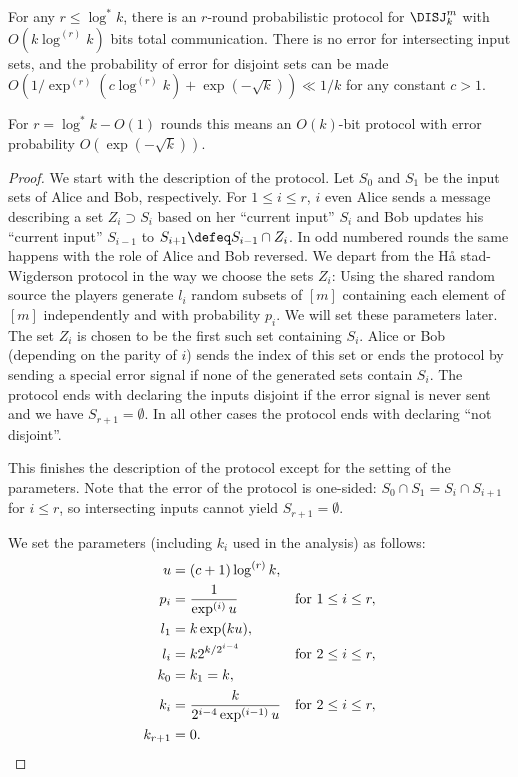 \begin{theorem}\label{thm:ub}
For any $r\leq \log^*k$, there is an $r$-round probabilistic
protocol for $\DISJ^m_k$ with $O(k\log^{(r)}k)$ bits total
communication. There is no error for intersecting input sets,
and the probability of error for disjoint sets can be made
$O(1/\exp^{(r)}(c\log^{(r)} k)+ \exp(-\sqrt k))\ll 1/k$ for any
constant $c > 1$.

For $r=\log^*k-O(1)$ rounds this means an $O(k)$-bit protocol
with error probability $O(\exp(-\sqrt k))$.
\end{theorem}

\begin{proof}
We start with the description of the protocol. Let $S_0$ and
$S_1$ be the input sets of Alice and Bob, respectively. For
$1\le i\le r$, $i$ even Alice sends a message describing a set
$Z_i\supset S_i$ based on her ``current input'' $S_i$ and Bob
updates his ``current input'' $S_{i-1}$ to $S_{i+1}\defeq
S_{i-1}\cap Z_i$. In odd numbered rounds the same happens with
the role of Alice and Bob reversed. We depart from the H\aa
stad-Wigderson protocol in the way we choose the sets $Z_i$:
Using the shared random source the players generate $l_i$ random
subsets of $[m]$ containing each element of $[m]$ independently
and with probability $p_i$. We will set these parameters later.
The set $Z_i$ is chosen to be the first such set containing
$S_i$. Alice or Bob (depending on the parity of $i$) sends the
index of this set or ends the protocol by sending a special
error signal if none of the generated sets contain $S_i$. The
protocol ends with declaring the inputs disjoint if the error
signal is never sent and we have $S_{r+1}=\emptyset$. In all
other cases the protocol ends with declaring ``not disjoint''.

This finishes the description of the protocol except for the
setting of the parameters. Note that the error of the protocol
is one-sided: $S_0\cap S_1=S_i\cap S_{i+1}$ for $i\le r$, so
intersecting inputs cannot yield $S_{r+1}=\emptyset$.

We set the parameters (including $k_i$ used in the analysis) 
as follows:
\begin{align*}
u&=(c+1)\log^{(r)}k,\\
p_i&=\frac1{\exp^{(i)}u}&\hbox{for }1\le i\le r,\\
l_1&=k\exp(ku),\\
l_i&=k2^{k/2^{i-4}}&\hbox{for }2\le i\le r,\\
k_0&=k_1=k,\\
k_i&=\frac k{2^{i-4}\exp^{(i-1)}u}&\hbox{for }2\le i\le r,\\
k_{r+1}&=0.
\end{align*}


\end{proof}
